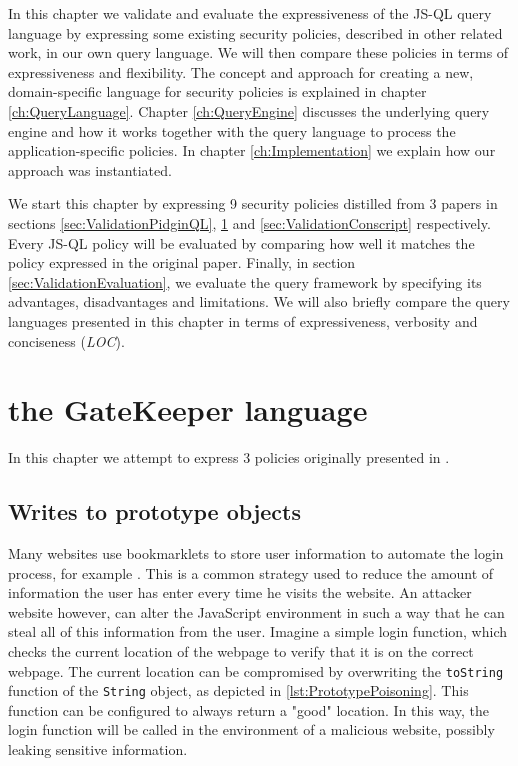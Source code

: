 In this chapter we validate and evaluate the expressiveness of the JS-QL query language by expressing some existing security policies, described in other related work, in our own query language. We will then compare these policies in terms of expressiveness and flexibility. %
The concept and approach for creating a new, domain-specific language for security policies is explained in chapter \ref{ch:QueryLanguage}. Chapter \ref{ch:QueryEngine} discusses the underlying query engine and how it works together with the query language to process the application-specific policies. In chapter \ref{ch:Implementation} we explain how our approach was instantiated.

We start this chapter by expressing 9 security policies distilled from 3 papers in sections \ref{sec:ValidationPidginQL}, \ref{sec:ValidationGK} and \ref{sec:ValidationConscript} respectively. Every JS-QL policy will be evaluated by comparing how well it matches the policy expressed in the original paper. Finally, in section \ref{sec:ValidationEvaluation}, we evaluate the query framework by specifying its advantages, disadvantages and limitations. We will also briefly compare the query languages presented in this chapter in terms of expressiveness, verbosity and conciseness (\textit{LOC}).
\section{the GateKeeper language}
\label{sec:ValidationGK}

In this chapter we attempt to express 3 policies originally presented in \cite{GateKeeper}.

\subsection{Writes to prototype objects}

Many websites use bookmarklets to store user information to automate the login process, for example \cite{PrototypePoisoning}. This is a common strategy used to reduce the amount of information the user has enter every time he visits the website. An attacker website however, can alter the JavaScript environment in such a way that he can steal all of this information from the user. Imagine a simple login function, which checks the current location of the webpage to verify that it is on the correct webpage. The current location can be compromised by overwriting the \texttt{toString} function of the \texttt{String} object, as depicted in \ref{lst:PrototypePoisoning}. This function can be configured to always return a "good" location. In this way, the login function will be called in the environment of a malicious website, possibly leaking sensitive information.


